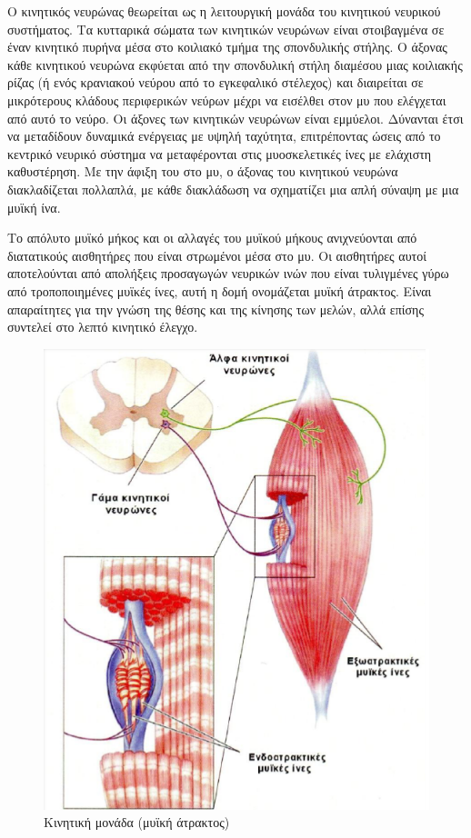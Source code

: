 Ο κινητικός νευρώνας θεωρείται ως η λειτουργική μονάδα του κινητικού νευρικού συστήματος. Τα κυτταρικά σώματα των κινητικών νευρώνων είναι στοιβαγμένα σε έναν κινητικό πυρήνα μέσα στο κοιλιακό τμήμα της σπονδυλικής στήλης. Ο άξονας κάθε κινητικού νευρώνα εκφύεται από την σπονδυλική στήλη διαμέσου μιας κοιλιακής ρίζας (ή ενός κρανιακού νεύρου από το εγκεφαλικό στέλεχος) και διαιρείται σε μικρότερους κλάδους περιφερικών νεύρων μέχρι να εισέλθει στον μυ που ελέγχεται από αυτό το νεύρο. Οι άξονες των κινητικών νευρώνων είναι εμμύελοι. Δύνανται έτσι να μεταδίδουν δυναμικά ενέργειας με υψηλή ταχύτητα, επιτρέποντας ώσεις από το κεντρικό νευρικό σύστημα να μεταφέρονται στις μυοσκελετικές ίνες με ελάχιστη καθυστέρηση. Με την άφιξη του στο μυ, ο άξονας του κινητικού νευρώνα διακλαδίζεται πολλαπλά, με κάθε διακλάδωση να σχηματίζει μια απλή σύναψη με μια μυϊκή ίνα.

Το απόλυτο μυϊκό μήκος και οι αλλαγές του μυϊκού μήκους ανιχνεύονται από διατατικούς αισθητήρες που είναι στρωμένοι μέσα στο μυ. Οι αισθητήρες αυτοί αποτελούνται από απολήξεις προσαγωγών νευρικών ινών που είναι τυλιγμένες γύρω από τροποποιημένες μυϊκές ίνες, αυτή η δομή ονομάζεται μυϊκή άτρακτος. Είναι απαραίτητες για την γνώση της θέσης και της κίνησης των μελών, αλλά επίσης συντελεί στο λεπτό κινητικό έλεγχο.

\begin{figure}[H]
    \centering
    \includegraphics[width=.8\textwidth, height=0.5\textheight, keepaspectratio]{fig/muscle-fysiology5.png}
    \caption{Κινητική μονάδα (μυϊκή άτρακτος)}
    \label{fig:muscle-fysiology5}
\end{figure}

